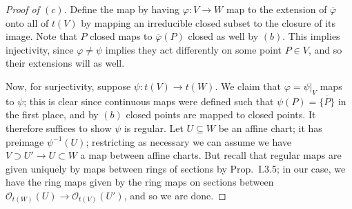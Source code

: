 \documentclass[10pt]{article}
\theoremstyle{definition}
\theoremstyle{remark}
\numberwithin{equation}{section}
\numberwithin{figure}{subsubsection}
\newcommand{\OO}{\mathcal{O}}
\begin{document}
\begin{proof}[Proof of $(c)$]
  Define the map by having $\varphi\colon V \to W$ map to the extension of $\overline{\varphi}$ onto all of $t(V)$ by mapping an irreducible closed subset to the closure of its image. Note that $P$ closed maps to $\overline{\varphi}(P)$ closed as well by $(b)$. This implies injectivity, since $\varphi \ne \psi$ implies they act differently on some point $P \in V$, and so their extensions will as well.
  \par Now, for surjectivity, suppose $\psi\colon t(V) \to t(W)$. We claim that $\varphi = \psi\vert_V$ maps to $\psi$; this is clear since continuous maps were defined such that $\psi(P) = \overline{\{P\}}$ in the first place, and by $(b)$ closed points are mapped to closed points. It therefore suffices to show $\psi$ is regular. Let $U \subseteq W$ be an affine chart; it has preimage $\psi^{-1}(U)$; restricting as necessary we can assume we have $V \supset U' \to U \subset W$ a map between affine charts. But recall that regular maps are given uniquely by maps between rings of sections by Prop.~I.3.5; in our case, we have the ring maps given by the ring maps on sections between $\OO_{t(W)}(U) \to \OO_{t(V)}(U')$, and so we are done.
\end{proof}
\end{document}
